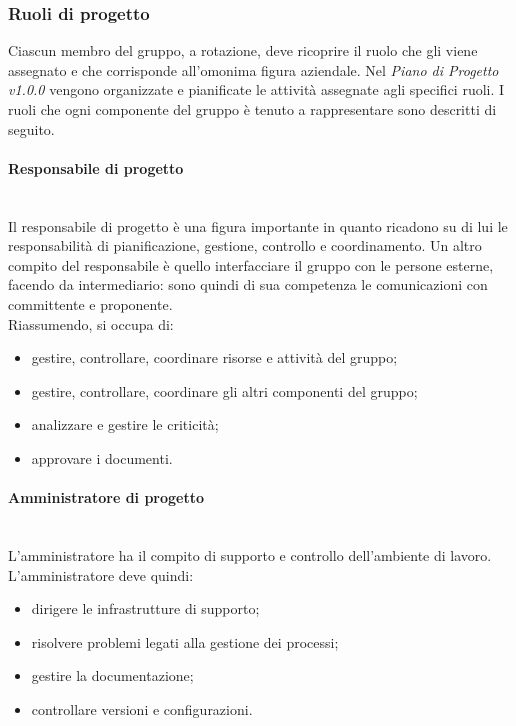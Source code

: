 		\subsubsection{Ruoli di progetto}
		Ciascun membro del gruppo, a rotazione, deve ricoprire il ruolo che gli viene assegnato e che corrisponde all'omonima figura aziendale. Nel \textit{Piano di Progetto v1.0.0} vengono organizzate e pianificate le attività assegnate agli specifici ruoli. I ruoli che ogni componente del gruppo è tenuto a rappresentare sono descritti di seguito.
			\paragraph{Responsabile di progetto} \mbox{}\\
			Il responsabile di progetto è una figura importante in quanto ricadono su di lui le responsabilità di pianificazione, gestione, controllo e coordinamento. Un altro compito del responsabile è quello interfacciare il gruppo con le persone esterne, facendo da intermediario: sono quindi di sua competenza le comunicazioni con committente e proponente. \\
			Riassumendo, si occupa di:
			\begin{itemize}
				\item gestire, controllare, coordinare risorse e attività del gruppo;
				\item  gestire, controllare, coordinare gli altri componenti del gruppo;
				\item analizzare e gestire le criticità;
				\item approvare i documenti.
			\end{itemize}
			\paragraph{Amministratore di progetto} \mbox{}\\
			L'amministratore ha il compito di supporto e controllo dell'ambiente di lavoro. \\
			L'amministratore deve quindi:
			\begin{itemize}
				\item dirigere le infrastrutture di supporto;
				\item risolvere problemi legati alla gestione dei processi;
				\item gestire la documentazione;
				\item controllare versioni e configurazioni.
			\end{itemize}
